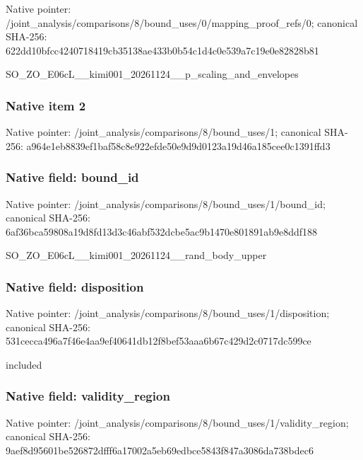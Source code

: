 \documentclass[10pt,a4paper]{article}
\begin{document}
Native pointer: /joint\_analysis/comparis\allowbreak{}ons/8/bound\_uses/0/mappi\allowbreak{}ng\_proof\_refs/0; canonical SHA-256: 622dd10bfcc4240718419cb3\allowbreak{}5138ae433b0b54c1d4c0e539\allowbreak{}a7c19e0e82828b81


SO\_ZO\_E06cL\_\_kimi001\_202\allowbreak{}61124\_\_p\_scaling\_and\_env\allowbreak{}elopes


\subsubsection{Native item 2}


Native pointer: /joint\_analysis/comparis\allowbreak{}ons/8/bound\_uses/1; canonical SHA-256: a964e1eb8839ef1baf58c8e9\allowbreak{}22efde50e9d9d0123a19d46a\allowbreak{}185cee0c1391ffd3



\subsubsection{Native field: bound\_id}


Native pointer: /joint\_analysis/comparis\allowbreak{}ons/8/bound\_uses/1/bound\allowbreak{}\_id; canonical SHA-256: 6af36bca59808a19d8fd13d3\allowbreak{}c46abf532dcbe5ac9b1470e8\allowbreak{}01891ab9e8ddf188


SO\_ZO\_E06cL\_\_kimi001\_202\allowbreak{}61124\_\_rand\_body\_upper


\subsubsection{Native field: disposition}


Native pointer: /joint\_analysis/comparis\allowbreak{}ons/8/bound\_uses/1/dispo\allowbreak{}sition; canonical SHA-256: 531cecca496a7f46e4aa9ef4\allowbreak{}0641db12f8bef53aaa6b67c4\allowbreak{}29d2c0717dc599ce


included


\subsubsection{Native field: validity\_region}


Native pointer: /joint\_analysis/comparis\allowbreak{}ons/8/bound\_uses/1/valid\allowbreak{}ity\_region; canonical SHA-256: 9aef8d95601be526872dfff6\allowbreak{}a17002a5eb69edbce5843f84\allowbreak{}7a3086da738bdec6
\end{document}
